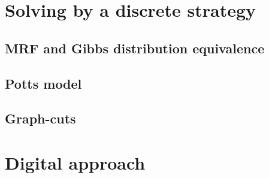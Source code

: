 \section{Solving by a discrete strategy}
	\subsection{MRF and Gibbs distribution equivalence}
	\subsection{Potts model}
	\subsection{Graph-cuts}

\section{Digital approach}

%
%
%
